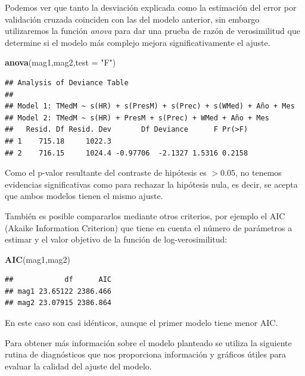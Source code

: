 \documentclass[12pt,a4paper,]{book}
\newenvironment{Shaded}{\begin{snugshade}}{\end{snugshade}}
\newcommand{\AttributeTok}[1]{\textcolor[rgb]{0.13,0.29,0.53}{#1}}
\newcommand{\FunctionTok}[1]{\textcolor[rgb]{0.13,0.29,0.53}{\textbf{#1}}}
\newcommand{\NormalTok}[1]{#1}
\newcommand{\StringTok}[1]{\textcolor[rgb]{0.31,0.60,0.02}{#1}}
\numberwithin{dummy}{section}
\theoremstyle{ocrenumbox}
\theoremstyle{blacknumex}
\theoremstyle{blacknumbox}
\theoremstyle{ocrenum}
\theoremstyle{ocrenum}
\begin{document}
Podemos ver que tanto la desviación explicada como la estimación del
error por validación cruzada coinciden con las del modelo anterior, sin
embargo utilizaremos la función \emph{anova} para dar una prueba de
razón de verosimilitud que determine si el modelo más complejo mejora
significativamente el ajuste.

\begin{Shaded}
\begin{Highlighting}[]
\FunctionTok{anova}\NormalTok{(mag1,mag2,}\AttributeTok{test =} \StringTok{"F"}\NormalTok{)}
\end{Highlighting}
\end{Shaded}

\begin{verbatim}
## Analysis of Deviance Table
## 
## Model 1: TMedM ~ s(HR) + s(PresM) + s(Prec) + s(WMed) + Año + Mes
## Model 2: TMedM ~ s(HR) + PresM + s(Prec) + WMed + Año + Mes
##   Resid. Df Resid. Dev       Df Deviance      F Pr(>F)
## 1    715.18     1022.3                                
## 2    716.15     1024.4 -0.97706  -2.1327 1.5316 0.2158
\end{verbatim}

Como el p-valor resultante del contraste de hipótesis es \(>0.05\), no
tenemos evidencias significativas como para rechazar la hipótesis nula,
es decir, se acepta que ambos modelos tienen el mismo ajuste.

También es posible compararlos mediante otros criterios, por ejemplo el
AIC (Akaike Information Criterion) que tiene en cuenta el número de
parámetros a estimar y el valor objetivo de la función de
log-verosimilitud:

\begin{Shaded}
\begin{Highlighting}[]
\FunctionTok{AIC}\NormalTok{(mag1,mag2)}
\end{Highlighting}
\end{Shaded}

\begin{verbatim}
##            df      AIC
## mag1 23.65122 2386.466
## mag2 23.07915 2386.864
\end{verbatim}

En este caso son casi idénticos, aunque el primer modelo tiene menor
AIC.

Para obtener más información sobre el modelo planteado se utiliza la
siguiente rutina de diagnósticos que nos proporciona información y
gráficos útiles para evaluar la calidad del ajuste del modelo.
\end{document}
